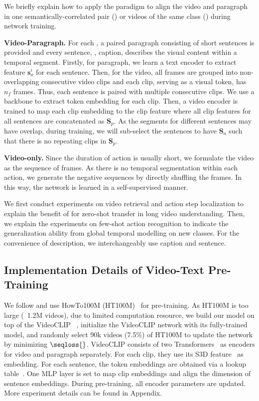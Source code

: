 We briefly explain how to apply the paradigm to align the video and paragraph in one semantically-correlated pair (\vltype{}) or videos of the same class (\votype{}) during network training.

\textbf{Video-Paragraph.} For each \longvideo{}, a paired paragraph consisting of short sentences is provided and every sentence, \ie, caption, describes the visual content within a temporal segment. 
Firstly, for paragraph, we learn a text encoder to extract feature $\mathbf{s}_a^{i}$ for each sentence.
Then, for the video, all frames are grouped into non-overlapping consecutive video clips and each clip, serving as a visual token, has $n_f$ frames. Thus, each sentence is paired with multiple consecutive clips.
We use a backbone to extract token embedding for each clip.
Then, a video encoder is trained to map each clip embedding to the clip feature where all clip features for all sentences are concatenated as $\mathbf{S}_p$.
As the segments for different sentences may have overlap, during training, we will sub-select the sentences to have $\mathbf{S}_a$ such that there is no repeating clips in $\mathbf{S}_p$.

\textbf{Video-only.} Since the duration of action is usually short, we formulate the video as the sequence of frames. As there is no temporal segmentation within each action, we generate the negative sequences by directly shuffling the frames.
In this way, the network is learned in a self-supervised manner.

We first conduct experiments on video retrieval and action step localization to explain the benefit of \approach{} for zero-shot transfer in long video understanding.
Then, we explain the experiments on few-shot action recognition to indicate the generalization ability from global temporal modelling on new classes.
For the convenience of description, we interchangeably use caption and sentence.

\subsection{Implementation Details of Video-Text Pre-Training}

We follow \citet{xu2021videoclip} and use HowTo100M (HT100M)~\citep{miech2019howto100m} for pre-training. 
As HT100M is too large (~1.2M videos), due to limited computation resource, we build our model on top of the VideoCLIP~\citep{xu2021videoclip} \ie, initialize the VideoCLIP network with its fully-trained model, and randomly select 90k videos (7.5\%) of HT100M to update the network by minimizing $\seqloss{}$. 
VideoCLIP consists of two Transformers~\citep{vaswani2017attention} as encoders for video and paragraph separately. For each clip, they use its S3D feature~\citep{xie2018rethinking} as embedding.
For each sentence, the token embeddings are obtained via a lookup table~\citep{devlin2018bert}.
One MLP layer is set to map clip embeddings and align the dimension of sentence embeddings. 
During pre-training, all encoder parameters are updated.
More experiment details can be found in Appendix.

